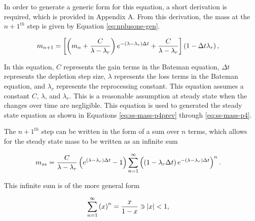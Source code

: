 In order to generate a generic form for this equation, a short derivation is required, which is provided in Appendix A. From this derivation, the mass at the $n+1^{th}$ step is given by Equation \eqref{eq:nplusone-gen}.

\begin{equation} \hfill 
m_{n+1} = \left[ \left(m_n + \frac{C}{\lambda - \lambda_r} \right)e^{-(\lambda - \lambda_r) \Delta t} + \frac{C}{\lambda - \lambda_r} \right] \left(1 - \Delta t \lambda_r \right),
\hfill\label{eq:nplusone-gen} \end{equation}

In this equation, $C$ represents the gain terms in the Bateman equation, $\Delta t$ represents the depletion step size, $\lambda$ represents the loss terms in the Bateman equation, and $\lambda_r$ represents the reprocessing constant. This equation assumes a constant $C$, $\lambda$, and $\lambda_r$.
This is a reasonable assumption at steady state when the changes over time are negligible. This equation is used to generated the steady state equation as shown in Equations \eqref{eq:ss-mass-p4prev} through \eqref{eq:ss-mass-p4}.


The $n+1^{th}$ step can be written in the form of a sum over $n$ terms, which allows for the steady state mass to be written as an infinite sum

\begin{equation} \hfill 
m_{ss} =  \frac{C}{\lambda - \lambda_r} \left(e^{(\lambda - \lambda_r) \Delta t} - 1 \right) \sum_{n=1}^{\infty} \left( \left(1 - \lambda_r \Delta t \right) e^{-(\lambda - \lambda_r) \Delta t} \right)^n.
\hfill\label{eq:ss-mass-p4prev} \end{equation}

This infinite sum is of the more general form

\begin{equation} \hfill 
\sum_{n=1}^\infty \left( x \right)^n = \frac{x}{1-x} \ni |x| < 1,
\hfill\label{eq:ss-mass-p4next} \end{equation}

